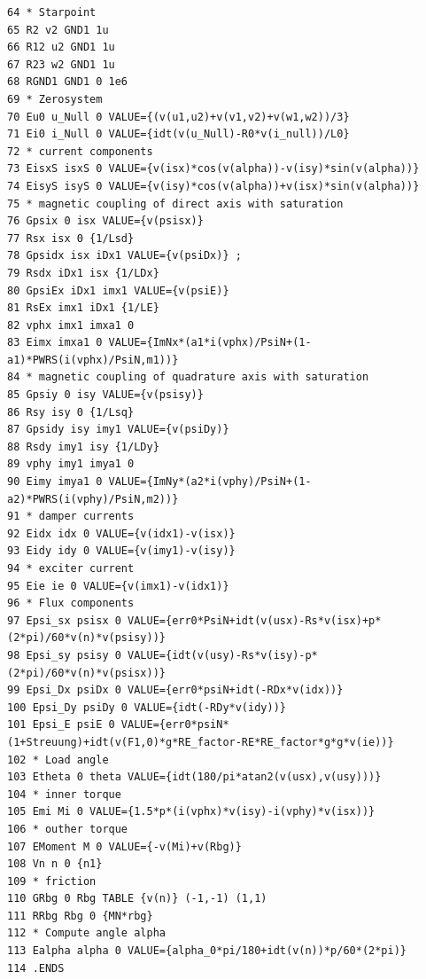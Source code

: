 \begin{lstlisting}[style=LTspice,caption={Behavioral implementation of a synchronous generator.},label={lst:synchronous generator}]
64 * Starpoint
65 R2 v2 GND1 1u
66 R12 u2 GND1 1u
67 R23 w2 GND1 1u
68 RGND1 GND1 0 1e6
69 * Zerosystem
70 Eu0 u_Null 0 VALUE={(v(u1,u2)+v(v1,v2)+v(w1,w2))/3}
71 Ei0 i_Null 0 VALUE={idt(v(u_Null)-R0*v(i_null))/L0}
72 * current components
73 EisxS isxS 0 VALUE={v(isx)*cos(v(alpha))-v(isy)*sin(v(alpha))}
74 EisyS isyS 0 VALUE={v(isy)*cos(v(alpha))+v(isx)*sin(v(alpha))}
75 * magnetic coupling of direct axis with saturation
76 Gpsix 0 isx VALUE={v(psisx)}
77 Rsx isx 0 {1/Lsd}
78 Gpsidx isx iDx1 VALUE={v(psiDx)} ;
79 Rsdx iDx1 isx {1/LDx}
80 GpsiEx iDx1 imx1 VALUE={v(psiE)}
81 RsEx imx1 iDx1 {1/LE}
82 vphx imx1 imxa1 0
83 Eimx imxa1 0 VALUE={ImNx*(a1*i(vphx)/PsiN+(1-a1)*PWRS(i(vphx)/PsiN,m1))}
84 * magnetic coupling of quadrature axis with saturation
85 Gpsiy 0 isy VALUE={v(psisy)}
86 Rsy isy 0 {1/Lsq}
87 Gpsidy isy imy1 VALUE={v(psiDy)}
88 Rsdy imy1 isy {1/LDy}
89 vphy imy1 imya1 0
90 Eimy imya1 0 VALUE={ImNy*(a2*i(vphy)/PsiN+(1-a2)*PWRS(i(vphy)/PsiN,m2))}
91 * damper currents
92 Eidx idx 0 VALUE={v(idx1)-v(isx)}
93 Eidy idy 0 VALUE={v(imy1)-v(isy)}
94 * exciter current
95 Eie ie 0 VALUE={v(imx1)-v(idx1)}
96 * Flux components
97 Epsi_sx psisx 0 VALUE={err0*PsiN+idt(v(usx)-Rs*v(isx)+p*(2*pi)/60*v(n)*v(psisy))}
98 Epsi_sy psisy 0 VALUE={idt(v(usy)-Rs*v(isy)-p*(2*pi)/60*v(n)*v(psisx))}
99 Epsi_Dx psiDx 0 VALUE={err0*psiN+idt(-RDx*v(idx))}
100 Epsi_Dy psiDy 0 VALUE={idt(-RDy*v(idy))}
101 Epsi_E psiE 0 VALUE={err0*psiN*(1+Streuung)+idt(v(F1,0)*g*RE_factor-RE*RE_factor*g*g*v(ie))}
102 * Load angle
103 Etheta 0 theta VALUE={idt(180/pi*atan2(v(usx),v(usy)))}
104 * inner torque
105 Emi Mi 0 VALUE={1.5*p*(i(vphx)*v(isy)-i(vphy)*v(isx))}
106 * outher torque
107 EMoment M 0 VALUE={-v(Mi)+v(Rbg)}
108 Vn n 0 {n1}
109 * friction
110 GRbg 0 Rbg TABLE {v(n)} (-1,-1) (1,1)
111 RRbg Rbg 0 {MN*rbg}
112 * Compute angle alpha
113 Ealpha alpha 0 VALUE={alpha_0*pi/180+idt(v(n))*p/60*(2*pi)}
114 .ENDS
\end{lstlisting}

%


